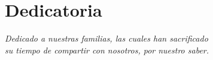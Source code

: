 \chapter*{\flushright Dedicatoria}

\begin{flushright}
	\textit{Dedicado a nuestras familias, las cuales han sacrificado \\ su tiempo de compartir con nosotros, por nuestro saber.}
\end{flushright}